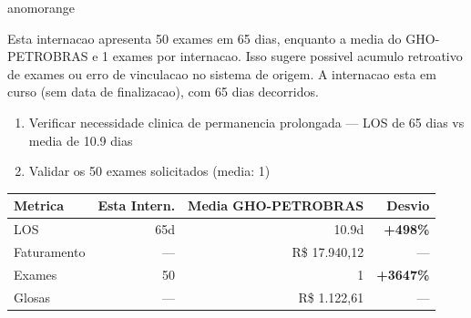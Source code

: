 \documentclass[a4paper,10pt]{article}
\begin{document}
\begin{anomalycard}[Internacao 162201 | GHO-PETROBRAS | ALTO (z=4.53)]{anomorange}
\vspace{2pt}\begin{tcolorbox}[colback=severityred!20,colframe=anomorange,title={\textbf{Interpretacao de Negocio}},fonttitle=\bfseries\small,left=4pt,right=4pt,top=3pt,bottom=3pt]
{\small Esta internacao apresenta 50 exames em 65 dias, enquanto a media do GHO-PETROBRAS e 1 exames por internacao. Isso sugere possivel acumulo retroativo de exames ou erro de vinculacao no sistema de origem. A internacao esta em curso (sem data de finalizacao), com 65 dias decorridos.}
\end{tcolorbox}
\begin{tcolorbox}[colback=severityyellow!30,colframe=anomorange,title={\textbf{Recomendacoes Especificas}},fonttitle=\bfseries\small,left=4pt,right=4pt,top=3pt,bottom=3pt]
\begin{enumerate}[nosep,leftmargin=16pt]
\item {\small Verificar necessidade clinica de permanencia prolongada --- LOS de 65 dias vs media de 10.9 dias}
\item {\small Validar os 50 exames solicitados (media: 1)}
\end{enumerate}
\end{tcolorbox}
\begin{center}\begin{tabular}{l r r r}\toprule\textbf{Metrica} & \textbf{Esta Intern.} & \textbf{Media GHO-PETROBRAS} & \textbf{Desvio} \\\midrule
LOS & 65d & 10.9d & \textcolor{anomred}{\textbf{+498\%}} \\
Faturamento & --- & R\$ 17.940,12 & --- \\
Exames & 50 & 1 & \textcolor{anomred}{\textbf{+3647\%}} \\
Glosas & --- & R\$ 1.122,61 & --- \\
\bottomrule\end{tabular}\end{center}


\end{anomalycard}
\end{document}
